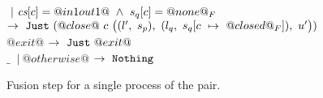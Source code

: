 \begin{figure*}
\begin{tabbing}
\> \> $~|~\cs[c]=@in1out1@ ~\wedge~ s_q[c]=@none@_F$ 
\> $\to~\Just (@close@~c~
      \nextStep
        {l'}{s_p}
        {l_q}{\HeapUpdateOne{c}{@closed@_F}{s_q}}
        {u'})
    $ 
\> 
\\[1ex]

\> $@exit@$
\> 
\> $\to~\Just @exit@$
\> 
\\[1ex]


\> $\_$ \> $~|~ @otherwise@ $
\> $\to ~ \Nothing$
\> 


\end{tabbing}

\caption{Fusion step for a single process of the pair.} 

\label{fig:Finite:tryStep}
\end{figure*}

\clearpage{}